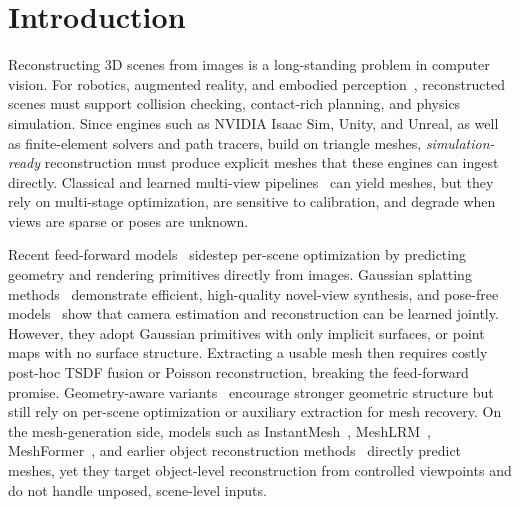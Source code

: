 \section{Introduction}

Reconstructing 3D scenes from images is a long-standing problem in computer vision.
For robotics, augmented reality, and embodied perception~\citep{qureshi2024splatsim,chhablani2025embodiedsplat}, reconstructed scenes must support collision checking, contact-rich planning, and physics simulation.
Since engines such as NVIDIA Isaac Sim, Unity, and Unreal, as well as finite-element solvers and path tracers, build on triangle meshes, \emph{simulation-ready} reconstruction must produce explicit meshes that these engines can ingest directly.
Classical and learned multi-view pipelines~\citep{schoenberger2016sfm,schoenberger2016mvs,furukawa2015multi} can yield meshes, but they rely on multi-stage optimization, are sensitive to calibration, and degrade when views are sparse or poses are unknown.


Recent feed-forward models~\citep{yu2021pixelnerf,chen2021mvsnerf,chen2024mvsplat,zhang2025advances} sidestep per-scene optimization by predicting geometry and rendering primitives directly from images.
Gaussian splatting methods~\citep{kerbl20233d,charatan2024pixelsplat,chen2024mvsplat,xu2024depthsplat,wang2025volsplat} demonstrate efficient, high-quality novel-view synthesis, and pose-free models~\citep{wang2024dust3r,zhang2025flare,wang2025vggt,ye2024no,ye2025yonosplat} show that camera estimation and reconstruction can be learned jointly.
However, they adopt Gaussian primitives with only implicit surfaces, or point maps with no surface structure. Extracting a usable mesh then requires costly post-hoc TSDF fusion or Poisson reconstruction, breaking the feed-forward promise.
Geometry-aware variants~\citep{huang20242d,yu2024gaussian,lyu20243dgsr,chang2025meshsplat,daisurfelsplat} encourage stronger geometric structure but still rely on per-scene optimization or auxiliary extraction for mesh recovery.
On the mesh-generation side, models such as InstantMesh~\citep{xu2024instantmesh}, MeshLRM~\citep{wei2024meshlrm}, MeshFormer~\citep{liu2024meshformer}, and earlier object reconstruction methods~\citep{choy20163d,kanazawa2018learning,wang2018pixel2mesh} directly predict meshes, yet they target object-level reconstruction from controlled viewpoints and do not handle unposed, scene-level inputs.


